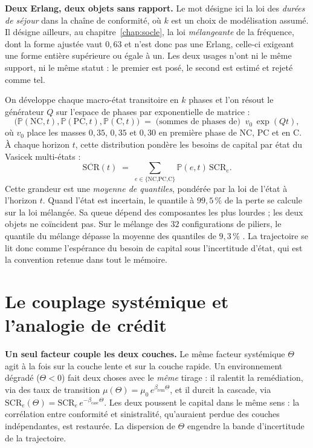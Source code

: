 \begin{attention}
\textbf{Deux Erlang, deux objets sans rapport.} Le mot désigne ici la loi des \emph{durées de
séjour} dans la chaîne de conformité, où $k$ est un choix de modélisation assumé. Il désigne
ailleurs, au chapitre~\ref{chap:socle}, la loi \emph{mélangeante} de la fréquence, dont la
forme ajustée vaut $0{,}63$ et n'est donc pas une Erlang, celle-ci exigeant une forme
entière supérieure ou égale à un. Les deux usages n'ont ni le même support, ni le même statut :
le premier est posé, le second est estimé et rejeté comme tel.
\end{attention} On développe chaque macro-état transitoire en $k$ phases et l'on résout le
générateur $Q$ sur l'espace de phases par exponentielle de matrice :
\begin{equation}
\big(\mathbb P(\text{NC},t),\mathbb P(\text{PC},t),\mathbb P(\text{C},t)\big)
\;=\; \text{(sommes de phases de)}\;\; v_0\,\exp(Qt),
\end{equation}
où $v_0$ place les masses $0{,}35$, $0{,}35$ et $0{,}30$ en première phase de NC, PC et en C.
À chaque horizon $t$, cette distribution pondère les
besoins de capital par état du Vasicek multi-états :
\begin{equation}
\overline{\mathrm{SCR}}(t)\;=\;\sum_{e\in\{\text{NC,PC,C}\}}\mathbb P(e,t)\,\mathrm{SCR}_e .
\end{equation}
Cette grandeur est une \emph{moyenne de quantiles}, pondérée par la loi de l'état à l'horizon
$t$. Quand l'état est incertain, le quantile à $99{,}5\,\%$ de la perte se calcule sur la loi mélangée.
Sa queue dépend des composantes les plus lourdes ; les deux objets ne coïncident pas. Sur le mélange des $32$ configurations de
piliers, le quantile du mélange dépasse la moyenne des quantiles de $9{,}3\,\%$ \matcomp. La
trajectoire se lit donc comme l'espérance du besoin de capital sous l'incertitude d'état, qui est
la convention retenue dans tout le mémoire.


\section{Le couplage systémique et l'analogie de crédit}

\begin{cle}
\textbf{Un seul facteur couple les deux couches.} Le même facteur systémique $\Theta$ agit à la
fois sur la couche lente et sur la couche rapide. Un environnement dégradé ($\Theta<0$) fait deux
choses avec le \emph{même} tirage : il ralentit la remédiation, via des taux de
transition $\mu(\Theta)=\mu_0\,e^{\beta_{\text{rem}}\Theta}$, et il durcit la cascade,
via $\mathrm{SCR}_e(\Theta)=\mathrm{SCR}_e\,e^{-\beta_{\text{casc}}\Theta}$. Les deux poussent le
capital dans le même sens : la corrélation entre conformité et sinistralité, qu'auraient perdue
des couches indépendantes, est restaurée. La dispersion de $\Theta$ engendre la bande
d'incertitude de la trajectoire.
\end{cle}

